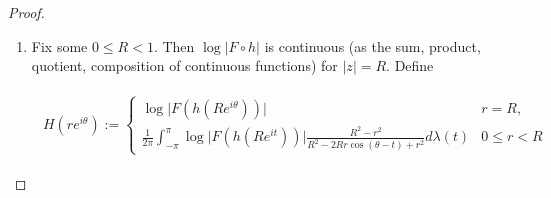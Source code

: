 \begin{proof}
\begin{enumerate}[label = \textbf{(\roman*.)}]
	Since $2i \neq 0$, $\psi$ is a linear fractional transformation (see \cite[279]{rudin:rc_analysis:1987}) with

	\begin{equation}
		\psi^{-1}(z) = \frac{z - i}{z + i}
	\end{equation}

	Therefore $\psi$ maps the unit circle $D$ onto the upper half plane. The principal value of $\log z$ denoted by $\Log z$ is defined by 

	\begin{equation}
		\Log z := \log \vert z \vert + i \Arg z \qquad z \neq 0
	\end{equation}

where $-\pi < \mathrm{Arg} z \leqslant \pi$ is the principal value of the argument of $z \neq 0$.  We see that $\pi i h(z)$ maps the upper half plane onto the strip $\mathbb{R} \times ]0,\pi[$. Thus $h(z)$ maps the unit circle $D$ onto the strip $]0,1[ \times \mathbb{R}$. By

\begin{equation}
	h'(z) = \frac{2}{\pi i} \frac{1}{z - 1}
\end{equation}

we see that $h$ is a holomorphic function on $D$. By composition, $F \circ h$ is holomorphic on $D$ and thus by \cite[336]{rudin:rc_analysis:1987} $\log\vert F \circ h \vert$ is subharmonic on $D$. It is easy to verify, that 

\begin{equation}
	h^{-1}(z) = \frac{e^{\pi i z} - i}{e^{\pi i z} + i}
\end{equation}
 on the unit strip $S$.\\

 \item Fix some $0 \leqslant R < 1$. Then $\log\vert F \circ h \vert$ is continuous (as the sum, product, quotient, composition of continuous functions) for $\vert z \vert = R$. Define 

\begin{gather*}
	\begin{aligned}
		H(re^{i\theta}):= \begin{cases}
			\displaystyle
			\log \vert F(h(Re^{i\theta}))\vert & r = R,\\
			\displaystyle
			\frac{1}{2\pi} \int_{-\pi}^\pi \log\vert F(h(Re^{it}))\vert \frac{R^2 - r^2}{R^2 - 2Rr\cos(\theta - t) + r^2} d\lambda(t) & 0 \leqslant r < R
	\end{cases}
	\end{aligned}
\end{gather*}


\end{enumerate}
\end{proof}
